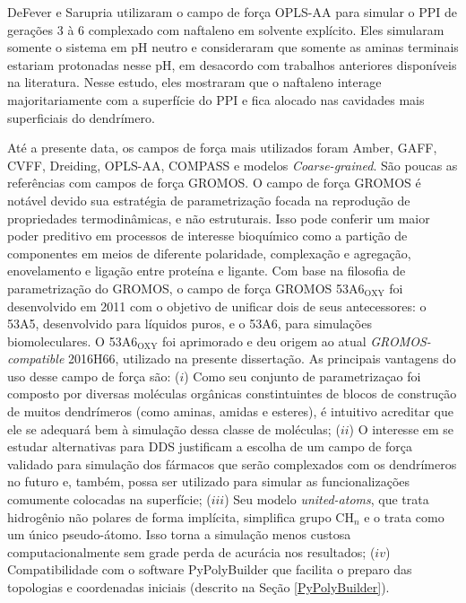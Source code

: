 DeFever e Sarupria\cite{DeFever2015} utilizaram o campo de força OPLS-AA\cite{Jorgensen1996} para simular o PPI de gerações $3$ à $6$ complexado com naftaleno em solvente explícito.
Eles simularam somente o sistema em pH neutro e consideraram que somente as aminas terminais estariam protonadas nesse pH, em desacordo com trabalhos anteriores disponíveis na literatura.
Nesse estudo, eles mostraram que o naftaleno interage majoritariamente com a superfície do PPI e fica alocado nas cavidades mais superficiais do dendrímero.

Até a presente data, os campos de força mais utilizados foram Amber\cite{Weiner1984}, GAFF\cite{Wang2004}, CVFF\cite{Lifson1979}, Dreiding\cite{Mayo1990}, OPLS-AA\cite{Jorgensen1996}, COMPASS\cite{Sun1998} e modelos \textit{Coarse-grained}\cite{Smeijers2016, Freire2015, Maiti2009, Wang2012}.
São poucas as referências com campos de força GROMOS.
O campo de força GROMOS é notável devido sua estratégia de parametrização focada na reprodução de propriedades termodinâmicas, e não estruturais.
Isso pode conferir um maior poder preditivo em processos de interesse bioquímico como a partição de componentes em meios de diferente polaridade, complexação e agregação, enovelamento e ligação entre proteína e ligante.
Com base na filosofia de parametrização do GROMOS, o campo de força GROMOS 53A6$_{\text{OXY}}$\cite{Horta2011} foi desenvolvido em 2011 com o objetivo de unificar dois de seus antecessores: o 53A5\cite{Oostenbrink2004}, desenvolvido para líquidos puros, e o 53A6\cite{Oostenbrink2004}, para simulações biomoleculares.
O 53A6$_{\text{OXY}}$ foi aprimorado e deu origem ao atual \textit{GROMOS-compatible} 2016H66\cite{Horta2016}, utilizado na presente dissertação.
As principais vantagens do uso desse campo de força são: 
($i$)   Como seu conjunto de parametrizaçao foi composto por diversas moléculas orgânicas constintuintes de blocos de construção de muitos dendrímeros (como aminas, amidas e esteres), é intuitivo acreditar que ele se adequará bem à simulação dessa classe de moléculas;
($ii$)  O interesse em se estudar alternativas para DDS justificam a escolha de um campo de força validado para simulação dos fármacos que serão complexados com os dendrímeros no futuro e, também, possa ser utilizado para simular as funcionalizações comumente colocadas na superfície;
($iii$) Seu modelo \textit{united-atoms}, que trata hidrogênio não polares de forma implícita, simplifica grupo CH$_n$ e o trata como um único pseudo-átomo. Isso torna a simulação menos custosa computacionalmente sem grade perda de acurácia nos resultados;
($iv$)  Compatibilidade com o software PyPolyBuilder que facilita o preparo das topologias e coordenadas iniciais (descrito na Seção \ref{PyPolyBuilder}).
